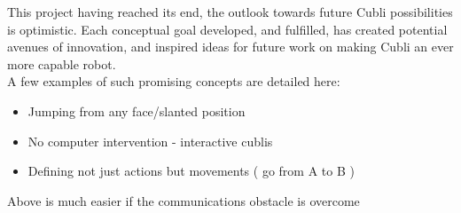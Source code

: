 This project having reached its end, the outlook towards future Cubli possibilities is optimistic. Each conceptual goal developed, and fulfilled, has created potential avenues of innovation, and inspired ideas for future work on making Cubli an ever more capable robot.\\

A few examples of such promising concepts are detailed here:

\begin{itemize}
\item Jumping from any face/slanted position

\item No computer intervention - interactive cublis

\item Defining not just actions but movements ( go from A to B )
\end{itemize}

Above is much easier if the communications obstacle is overcome


